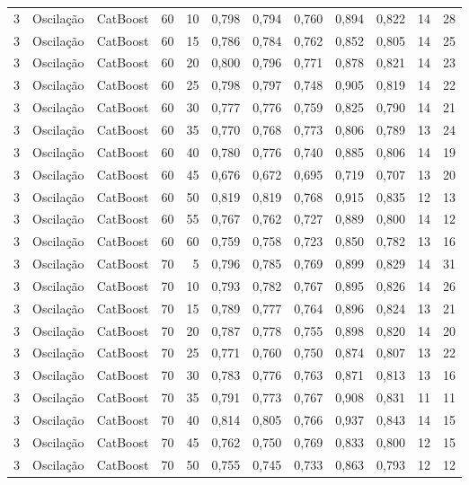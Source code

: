 \begin{longtable}{ccclrrrrrrrr}
3 & Oscilação & CatBoost & 60 & 10 & 0,798 & 0,794 & 0,760 & 0,894 & 0,822 & 14 & 28 \\
3 & Oscilação & CatBoost & 60 & 15 & 0,786 & 0,784 & 0,762 & 0,852 & 0,805 & 14 & 25 \\
3 & Oscilação & CatBoost & 60 & 20 & 0,800 & 0,796 & 0,771 & 0,878 & 0,821 & 14 & 23 \\
3 & Oscilação & CatBoost & 60 & 25 & 0,798 & 0,797 & 0,748 & 0,905 & 0,819 & 14 & 22 \\
3 & Oscilação & CatBoost & 60 & 30 & 0,777 & 0,776 & 0,759 & 0,825 & 0,790 & 14 & 21 \\
3 & Oscilação & CatBoost & 60 & 35 & 0,770 & 0,768 & 0,773 & 0,806 & 0,789 & 13 & 24 \\
3 & Oscilação & CatBoost & 60 & 40 & 0,780 & 0,776 & 0,740 & 0,885 & 0,806 & 14 & 19 \\
3 & Oscilação & CatBoost & 60 & 45 & 0,676 & 0,672 & 0,695 & 0,719 & 0,707 & 13 & 20 \\
3 & Oscilação & CatBoost & 60 & 50 & 0,819 & 0,819 & 0,768 & 0,915 & 0,835 & 12 & 13 \\
3 & Oscilação & CatBoost & 60 & 55 & 0,767 & 0,762 & 0,727 & 0,889 & 0,800 & 14 & 12 \\
3 & Oscilação & CatBoost & 60 & 60 & 0,759 & 0,758 & 0,723 & 0,850 & 0,782 & 13 & 16 \\
3 & Oscilação & CatBoost & 70 & 5 & 0,796 & 0,785 & 0,769 & 0,899 & 0,829 & 14 & 31 \\
3 & Oscilação & CatBoost & 70 & 10 & 0,793 & 0,782 & 0,767 & 0,895 & 0,826 & 14 & 26 \\
3 & Oscilação & CatBoost & 70 & 15 & 0,789 & 0,777 & 0,764 & 0,896 & 0,824 & 13 & 21 \\
3 & Oscilação & CatBoost & 70 & 20 & 0,787 & 0,778 & 0,755 & 0,898 & 0,820 & 14 & 20 \\
3 & Oscilação & CatBoost & 70 & 25 & 0,771 & 0,760 & 0,750 & 0,874 & 0,807 & 13 & 22 \\
3 & Oscilação & CatBoost & 70 & 30 & 0,783 & 0,776 & 0,763 & 0,871 & 0,813 & 13 & 16 \\
3 & Oscilação & CatBoost & 70 & 35 & 0,791 & 0,773 & 0,767 & 0,908 & 0,831 & 11 & 11 \\
3 & Oscilação & CatBoost & 70 & 40 & 0,814 & 0,805 & 0,766 & 0,937 & 0,843 & 14 & 15 \\
3 & Oscilação & CatBoost & 70 & 45 & 0,762 & 0,750 & 0,769 & 0,833 & 0,800 & 12 & 15 \\
3 & Oscilação & CatBoost & 70 & 50 & 0,755 & 0,745 & 0,733 & 0,863 & 0,793 & 12 & 12 \\

\end{longtable}
